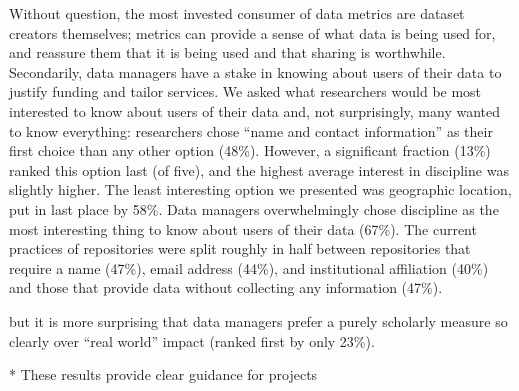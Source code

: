 
Without question, the most invested consumer of data metrics are dataset creators themselves; metrics can provide a sense of what data is being used for, and reassure them that it is being used and that sharing is worthwhile.
Secondarily, data managers have a stake in knowing about users of their data to justify funding and tailor services.
We asked what researchers would be most interested to know about users of their data and, not surprisingly, many wanted to know everything: researchers chose ``name and contact information'' as their first choice than any other option (48\%).
However, a significant fraction (13\%) ranked this option last (of five), and the highest average interest in discipline was slightly higher.
The least interesting option we presented was geographic location, put in last place by 58\%.
Data managers overwhelmingly chose discipline as the most interesting thing to know about users of their data (67\%).
The current practices of repositories were split roughly in half between repositories that require a name (47\%), email address (44\%), and institutional affiliation (40\%) and those that provide data without collecting any information (47\%).


but it is more surprising that data managers prefer a purely scholarly measure so clearly over ``real world'' impact (ranked first by only 23\%). 


* These results provide clear guidance for projects
